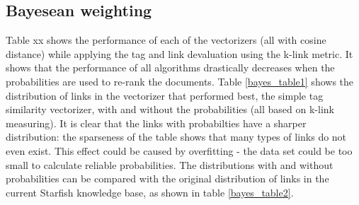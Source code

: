 \subsection{Bayesean weighting}
Table xx shows the performance of each of the vectorizers (all with cosine distance) while applying the tag and link devaluation using the k-link metric. It shows that the performance of all algorithms drastically decreases when the probabilities are used to re-rank the documents. Table \ref{bayes_table1}  shows the distribution of links in the vectorizer that performed best, the simple tag similarity vectorizer, with and without the probabilities (all based on k-link measuring). It is clear that the links with probabilties have a sharper distribution: the sparseness of the table shows that many types of links do not even exist. This effect could be caused by overfitting - the data set could be too small to calculate reliable probabilities. The distributions with and without probabilities can be compared with the original distribution of links in the current Starfish knowledge base, as shown in table \ref{bayes_table2}. 

